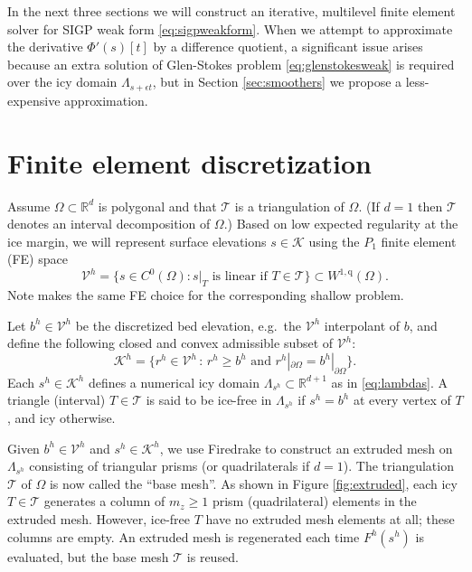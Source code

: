 \documentclass[letterpaper,final,12pt,reqno]{amsart}
\theoremstyle{claim}
\newcommand{\eps}{\epsilon}
\newcommand{\RR}{\mathbb{R}}
\newcommand{\qq}{{\text{q}}}
\numberwithin{equation}{section}
\numberwithin{figure}{section}
\numberwithin{table}{section}
\numberwithin{theorem}{section}
\begin{document}
In the next three sections we will construct an iterative, multilevel finite element solver for SIGP weak form \eqref{eq:sigpweakform}.  When we attempt to approximate the derivative $\Phi'(s)[t]$ by a difference quotient, a significant issue arises because an extra solution of Glen-Stokes problem \eqref{eq:glenstokesweak} is required over the icy domain $\Lambda_{s+\eps t}$, but in Section \ref{sec:smoothers} we propose a less-expensive approximation.


\section{Finite element discretization} \label{sec:fe}

Assume $\Omega \subset \RR^d$ is polygonal and that $\mathcal{T}$ is a triangulation of $\Omega$.  (If $d=1$ then $\mathcal{T}$ denotes an interval decomposition of $\Omega$.)  Based on low expected regularity at the ice margin, we will represent surface elevations $s\in \mathcal{K}$ using the $P_1$ finite element (FE) space
\begin{equation}
\mathcal{V}^h = \{s \in C^0(\Omega) : s|_T \text{ is linear if } T \in \mathcal{T}\} \subset W^{1,\qq}(\Omega).
\end{equation}
Note \cite{JouvetBueler2012} makes the same FE choice for the corresponding shallow problem.

Let $b^h \in \mathcal{V}^h$ be the discretized bed elevation, e.g.~the $\mathcal{V}^h$ interpolant of $b$, and define the following closed and convex admissible subset of $\mathcal{V}^h$:
\begin{equation}
\mathcal{K}^h = \{r^h \in \mathcal{V}^h \,:\, r^h \ge b^h \text{ and } r^h|_{\partial\Omega} = b^h|_{\partial\Omega}\}.  \label{eq:feK}
\end{equation}
Each $s^h\in \mathcal{K}^h$ defines a numerical icy domain $\Lambda_{s^h} \subset \RR^{d+1}$ as in \eqref{eq:lambdas}.  A triangle (interval) $T\in\mathcal{T}$ is said to be ice-free in $\Lambda_{s^h}$ if $s^h=b^h$ at every vertex of $T$, and icy otherwise.

Given $b^h \in \mathcal{V}^h$ and $s^h \in \mathcal{K}^h$, we use Firedrake to construct an extruded mesh \cite{McRaeetal2016} on $\Lambda_{s^h}$ consisting of triangular prisms (or quadrilaterals if $d=1$).  The triangulation $\mathcal{T}$ of $\Omega$ is now called the ``base mesh''.  As shown in Figure \ref{fig:extruded}, each icy $T \in \mathcal{T}$ generates a column of $m_z \ge 1$ prism (quadrilateral) elements in the extruded mesh.  However, ice-free $T$ have no extruded mesh elements at all; these columns are empty.  An extruded mesh is regenerated each time $F^h(s^h)$ is evaluated, but the base mesh $\mathcal{T}$ is reused.
\end{document}
